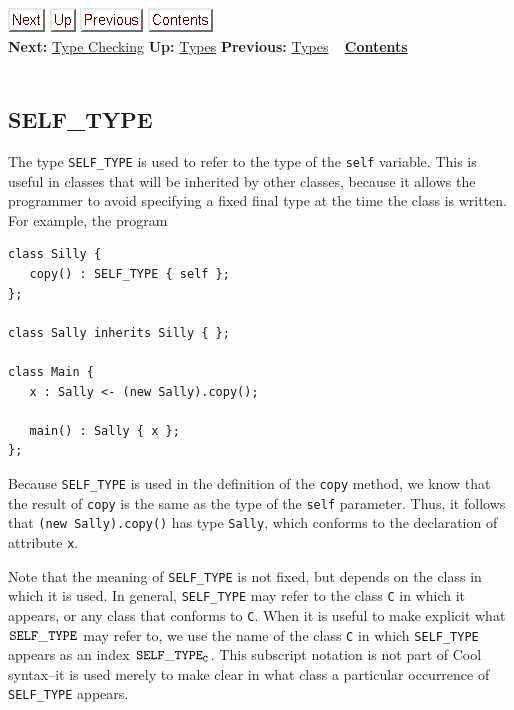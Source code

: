 \documentclass[]{article}
\begin{document}
\href{node9.html}{\includegraphics{next.png}}
\href{node7.html}{\includegraphics{up.png}}
\href{node7.html}{\includegraphics{prev.png}}
\href{node1.html}{\includegraphics{contents.png}} \\ \textbf{Next:}
\href{node9.html}{Type Checking} \textbf{Up:} \href{node7.html}{Types}
\textbf{Previous:} \href{node7.html}{Types} ~
\textbf{\href{node1.html}{Contents}} \\ \\

\subsection{SELF\_TYPE}

The type \texttt{SELF\_TYPE} is used to refer to the type of the
\texttt{self} variable. This is useful in classes that will be inherited
by other classes, because it allows the programmer to avoid specifying a
fixed final type at the time the class is written. For example, the
program

\begin{verbatim}
class Silly {
   copy() : SELF_TYPE { self };
};

class Sally inherits Silly { };

class Main {
   x : Sally <- (new Sally).copy();

   main() : Sally { x };
};
\end{verbatim}

Because \texttt{SELF\_TYPE} is used in the definition of the
\texttt{copy} method, we know that the result of \texttt{copy} is the
same as the type of the \texttt{self} parameter. Thus, it follows that
\texttt{(new Sally).copy()} has type \texttt{Sally}, which conforms to
the declaration of attribute \texttt{x}.

Note that the meaning of \texttt{SELF\_TYPE} is not fixed, but depends
on the class in which it is used. In general, \texttt{SELF\_TYPE} may
refer to the class \texttt{C} in which it appears, or any class that
conforms to \texttt{C}. When it is useful to make explicit what
${\tt SELF\_TYPE}$ may refer to, we use the name of the class \texttt{C}
in which \texttt{SELF\_TYPE} appears as an index
${\tt SELF\_TYPE}_{\tt C}$. This subscript notation is not part of Cool
syntax--it is used merely to make clear in what class a particular
occurrence of \texttt{SELF\_TYPE} appears.
\end{document}
